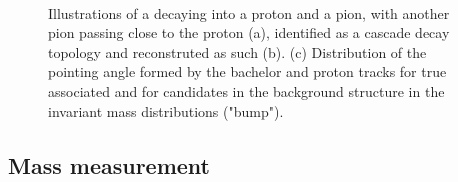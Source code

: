 \begin{figure}[t]
\centering
\\
	\caption{Illustrations of a \rmLambda decaying into a proton and a pion, with another pion passing close to the proton (a), identified as a cascade decay topology and reconstruted as such (b). (c) Distribution of the pointing angle formed by the bachelor and proton tracks for true associated \rmXi and for candidates in the background structure in the invariant mass distributions ("bump").}
	\label{fig:WrongTopology}
\end{figure}

\subsection{Mass measurement}
\label{subsec:MassExtraction}

